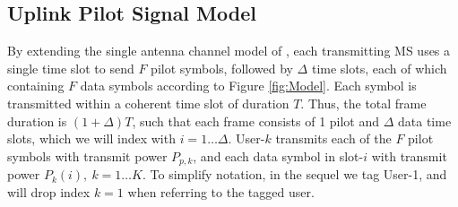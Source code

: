 \documentclass[conference, a4paper, 10pt]{IEEEtran}
\begin{document}
\subsection{Uplink Pilot Signal Model}
By extending the single antenna channel model of \cite{Savazzi:09},
each transmitting \ac{MS} uses a single time slot to send $F$ pilot symbols,
followed by $\Delta$ time slots, each of which containing $F$ data symbols according to Figure \ref{fig:Model}.
Each symbol is transmitted within a coherent time slot of duration $T$.
Thus, the total frame duration is $(1+\Delta) T$, such that each frame consists of 1 pilot
and $\Delta$ data time slots, which we will index with $i=1 \ldots \Delta$.
User-$k$ transmits each of the $F$ pilot symbols with transmit power $P_{p,k}$, and each data
symbol in slot-$i$ with transmit power $P_k(i),~k=1 \ldots K$.
To simplify notation, in the sequel we tag User-1, and will
drop index $k=1$ when referring to the tagged user.
\end{document}
